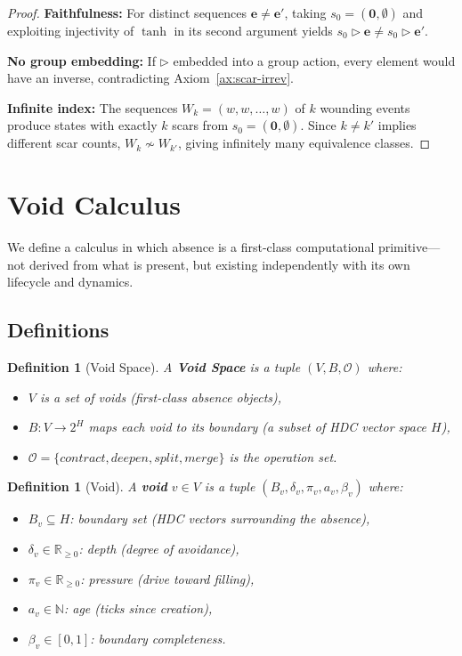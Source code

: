 \documentclass[11pt]{article}
\newtheorem{definition}[theorem]{Definition}
\begin{document}
\begin{proof}
\textbf{Faithfulness:} For distinct sequences $\mathbf{e} \neq \mathbf{e}'$, taking $s_0 = (\mathbf{0}, \emptyset)$ and exploiting injectivity of $\tanh$ in its second argument yields $s_0 \triangleright \mathbf{e} \neq s_0 \triangleright \mathbf{e}'$.

\textbf{No group embedding:} If $\triangleright$ embedded into a group action, every element would have an inverse, contradicting Axiom~\ref{ax:scar-irrev}.

\textbf{Infinite index:} The sequences $W_k = (w, w, \ldots, w)$ of $k$ wounding events produce states with exactly $k$ scars from $s_0 = (\mathbf{0}, \emptyset)$. Since $k \neq k'$ implies different scar counts, $W_k \not\sim W_{k'}$, giving infinitely many equivalence classes.
\end{proof}

\section{Void Calculus}
\label{sec:void}

We define a calculus in which absence is a first-class computational primitive---not derived from what is present, but existing independently with its own lifecycle and dynamics.

\subsection{Definitions}

\begin{definition}[Void Space]
\label{def:void-space}
A \textbf{Void Space} is a tuple $(V, B, \mathcal{O})$ where:
\begin{itemize}
\item $V$ is a set of voids (first-class absence objects),
\item $B: V \to 2^H$ maps each void to its boundary (a subset of HDC vector space $H$),
\item $\mathcal{O} = \{contract, deepen, split, merge\}$ is the operation set.
\end{itemize}
\end{definition}

\begin{definition}[Void]
\label{def:void}
A \textbf{void} $v \in V$ is a tuple $(B_v, \delta_v, \pi_v, a_v, \beta_v)$ where:
\begin{itemize}
\item $B_v \subseteq H$: boundary set (HDC vectors surrounding the absence),
\item $\delta_v \in \mathbb{R}_{\geq 0}$: depth (degree of avoidance),
\item $\pi_v \in \mathbb{R}_{\geq 0}$: pressure (drive toward filling),
\item $a_v \in \mathbb{N}$: age (ticks since creation),
\item $\beta_v \in [0,1]$: boundary completeness.
\end{itemize}
\end{definition}
\end{document}
